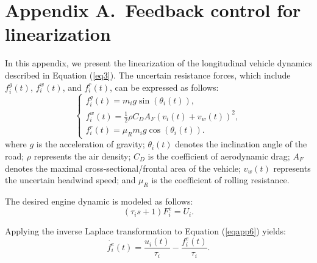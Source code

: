 \documentclass[a4paper]{cas-sc}
\begin{document}
\section*{Appendix A.~Feedback control for linearization}
\label{AppendixA}
In this appendix, we present the linearization of the longitudinal vehicle dynamics described in Equation (\ref{eq3}). The uncertain resistance forces, which include $f_i^g(t)$, $f_i^w(t)$, and $f_i^r(t)$, can be expressed as follows:
\begin{equation}
  \left\{\begin{array}{l}
    f_{i}^{g}(t)=m_{i} g \sin \left(\theta_{i}(t)\right),                        \\
    f_{i}^{w}(t)=\frac{1}{2} \rho C_{D} A_{F}\left(v_{i}(t)+v_{w}(t)\right)^{2}, \\
    f_{i}^{r}(t)=\mu_{R} m_{i} g \cos \left(\theta_{i}(t)\right).
  \end{array}\right.
  \label{eqapp5}
\end{equation}
where $g$ is the acceleration of gravity; $\theta_i(t)$ denotes the inclination angle of the road; $\rho$ represents the air density; $C_D$ is the coefficient of aerodynamic drag; $A_F$ denotes the maximal cross-sectional/frontal area of the vehicle; $v_w(t)$ represents the uncertain headwind speed; and $\mu_R$ is the coefficient of rolling resistance.


The desired engine dynamic is modeled as follows:
\begin{equation}
  (\tau_is+1)F_i^e=U_i.
  \label{eqapp6}
\end{equation}

Applying the inverse Laplace transformation to Equation (\ref{eqapp6}) yields:
\begin{equation}
  \dot{f_i^e}\left(t\right)=\frac{u_i(t)}{\tau_i}-\frac{f_i^e\left(t\right)}{\tau_i}.
  \label{eqapp7}
\end{equation}
\end{document}
